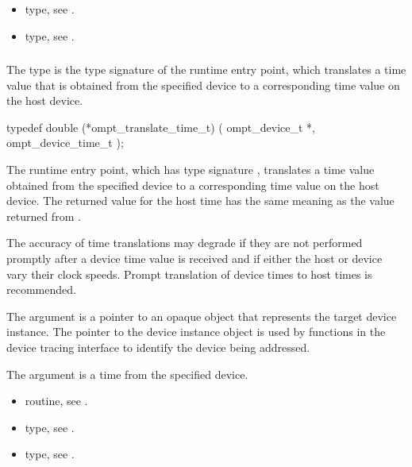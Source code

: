 \crossreferences
\begin{itemize}
\item {} type, see .

\item {} type, see .
\end{itemize}



\subsubsection{}
\label{sec:ompt_translate_time_t}

\summary
The  type is the type signature of the 
 runtime entry point, which translates a 
time value that is obtained from the specified device to a corresponding 
time value on the host device.

\format
\begin{ccppspecific}
\begin{omptInquiry}
typedef double (*ompt_translate_time_t) (
  ompt_device_t *,
  ompt_device_time_t 
);
\end{omptInquiry}
\end{ccppspecific}

\descr
The  runtime entry point, which has type signature 
, translates a time value obtained from the specified 
device to a corresponding time value on the host device. The returned value for 
the host time has the same meaning as the value returned from .

\begin{note}
The accuracy of time translations may degrade if they are not performed promptly 
after a device time value is received and if either the host or device vary their 
clock speeds. Prompt translation of device times to host times is recommended.
\end{note}

\argdesc
The  argument is a pointer to an opaque object that
represents the target device instance. The pointer to the device
instance object is used by functions in the device tracing interface
to identify the device being addressed.

The  argument is a time from the specified device.

\crossreferences
\begin{itemize}
\item {} routine, see .

\item {} type, see .

\item {} type, see .
\end{itemize}



